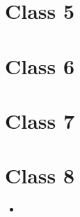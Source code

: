\documentclass[11pt]{article}
\newenvironment{itemise}{
\begin{itemize}
  \setlength{\itemsep}{1pt}
  \setlength{\parskip}{0pt}
  \setlength{\parsep}{0pt}
}{\end{itemize}}
\begin{document}
\section*{Class 5}
\section*{Class 6}
\section*{Class 7}
\section*{Class 8}


\begin{itemise}
\item 
\end{itemise}

















%
%
\end{document}
